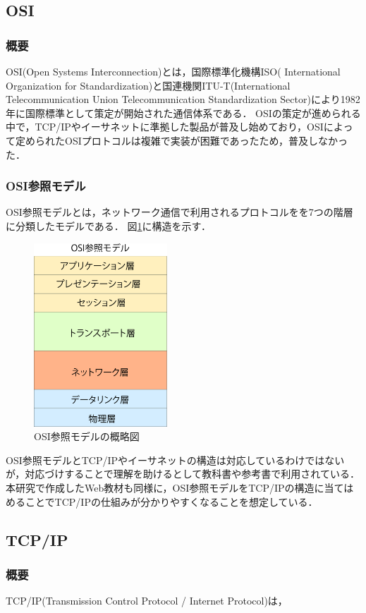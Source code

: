 \documentclass[12pt,a4j,titlepage]{ltjsarticle}
\begin{document}
\subsection{OSI}
\subsubsection{概要}
OSI(Open Systems Interconnection)とは，国際標準化機構ISO( International Organization for Standardization)と国連機関ITU-T(International Telecommunication Union Telecommunication Standardization Sector)により1982年に国際標準として策定が開始された通信体系である．
OSIの策定が進められる中で，TCP/IPやイーサネットに準拠した製品が普及し始めており，OSIによって定められたOSIプロトコルは複雑で実装が困難であったため，普及しなかった．
\subsubsection{OSI参照モデル}
OSI参照モデルとは，ネットワーク通信で利用されるプロトコルをを7つの階層に分類したモデルである．
図\ref{fig:osi}に構造を示す．

\begin{figure}[h]
\centering
\includegraphics[clip,width=50mm]{figures/osi.pdf}
\caption[OSI参照モデルの概略図]{OSI参照モデルの概略図\linebreak}
\label{fig:osi}
\end{figure}

OSI参照モデルとTCP/IPやイーサネットの構造は対応しているわけではないが，対応づけすることで理解を助けるとして教科書や参考書で利用されている．
本研究で作成したWeb教材も同様に，OSI参照モデルをTCP/IPの構造に当てはめることでTCP/IPの仕組みが分かりやすくなることを想定している．
\subsection{TCP/IP}
\subsubsection{概要}
TCP/IP(Transmission Control Protocol / Internet Protocol)は，
\end{document}

